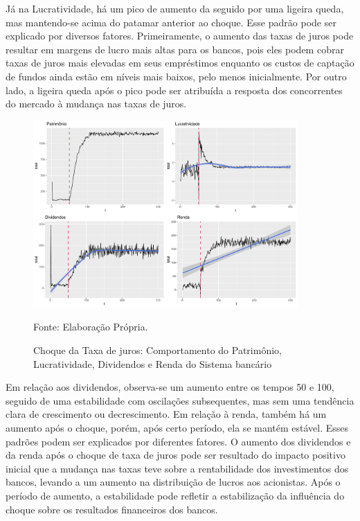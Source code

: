 \documentclass[hidelinks, article,12pt,oneside,a4paper,english,brazil,sumario=tradicional]{abntex2}
\begin{document}
Já na Lucratividade, há um pico de aumento da seguido por uma ligeira queda, mas mantendo-se acima do patamar anterior ao choque. Esse padrão pode ser explicado por diversos fatores. Primeiramente, o aumento das taxas de juros pode resultar em margens de lucro mais altas para os bancos, pois eles podem cobrar taxas de juros mais elevadas em seus empréstimos enquanto os custos de captação de fundos ainda estão em níveis mais baixos, pelo menos inicialmente. Por outro lado, a ligeira queda após o pico pode ser atribuída a resposta dos concorrentes do mercado à mudança nas taxas de juros.




\begin{figure} [H]
\caption{Choque da Taxa de juros: Comportamento do Patrimônio, Lucratividade, Dividendos e Renda do Sistema bancário} \label{fig:tx_juros_01}
\centering %

\includegraphics[width=0.9\textwidth]{figs/juros_01.pdf}

Fonte: Elaboração Própria.
\label{fig:dec_var_fbcf}
\end{figure}


Em relação aos dividendos, observa-se um aumento entre os tempos 50 e 100, seguido de uma estabilidade com oscilações subsequentes, mas sem uma tendência clara de crescimento ou decrescimento. Em relação à renda, também há um aumento após o choque, porém, após certo período, ela se mantém estável. Esses padrões podem ser explicados por diferentes fatores. O aumento dos dividendos e da renda após o choque de taxa de juros pode ser resultado do impacto positivo inicial que a mudança nas taxas teve sobre a rentabilidade dos investimentos dos bancos, levando a um aumento na distribuição de lucros aos acionistas. Após o período de aumento, a estabilidade pode refletir a estabilização da influência do choque sobre os resultados financeiros dos bancos.
\end{document}
